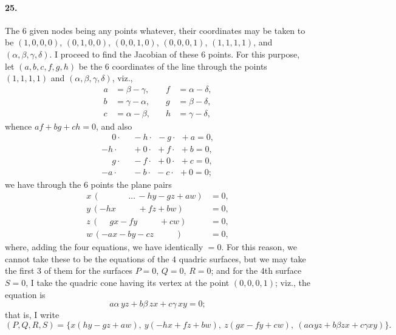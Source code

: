 \documentclass[11pt,a4paper]{article}
\begin{document}
\paragraph{25.}
The $6$ given nodes being any points whatever, their coordinates may be taken to be
$(1, 0, 0, 0)$, $(0, 1, 0, 0)$, $(0, 0, 1, 0)$, $(0, 0, 0, 1)$, $(1, 1, 1, 1)$, and
$(\alpha, \beta, \gamma, \delta)$. I proceed to find the Jacobian of these $6$ points. For
this purpose, let $(a, b, c, f, g, h)$ be the $6$ coordinates of the line through the
points $(1, 1, 1, 1)$ and $(\alpha, \beta, \gamma, \delta)$, viz.,
\[
\begin{aligned}
a &= \beta - \gamma,\quad & f &= \alpha - \delta, \\
b &= \gamma - \alpha,\quad & g &= \beta - \delta, \\
c &= \alpha - \beta,\quad & h &= \gamma - \delta,
\end{aligned}
\]
whence $af + bg + ch = 0$, and also
\[
\begin{aligned}
\phantom{-} 0 \cdot &\phantom{a} - h \cdot \phantom{b} - g \cdot \phantom{c} + a = 0, \\
-h \cdot &\phantom{a} + 0 \cdot \phantom{b} + f \cdot \phantom{c} + b = 0, \\
\phantom{-} g \cdot &\phantom{a} - f \cdot \phantom{b} + 0 \cdot \phantom{c} + c = 0, \\
-a \cdot &\phantom{a} - b \cdot \phantom{b} - c \cdot \phantom{c} + 0 = 0;
\end{aligned}
\]
we have through the $6$ points the plane pairs
\[
\begin{aligned}
x \,(\phantom{-h x +}\, \ldots\, - h y - g z + a w) &= 0, \\
y \,(-h x \phantom{\,+ \ldots\,}\, + f z + b w) &= 0, \\
z \,(\phantom{-}g x - f y \phantom{\,+ \ldots\,}\, + c w) &= 0, \\
w \,(-a x - b y - c z \phantom{\,+ \ldots\,}\,) &= 0,
\end{aligned}
\]
where, adding the four equations, we have identically $= 0$. For this reason, we cannot
take these to be the equations of the $4$ quadric surfaces, but we may take the first $3$
of them for the surfaces $P = 0$, $Q = 0$, $R = 0$; and for the $4$th surface $S = 0$, I
take the quadric cone having its vertex at the point $(0, 0, 0, 1)$; viz., the equation is
\[
a \alpha\,y z + b \beta\,z x + c \gamma\,x y = 0;
\]
that is, I write
\[
(P, Q, R, S) = \{x(hy - gz + aw),\ y(-hx + fz + bw),\ z(gx - fy + cw),\ (a\alpha yz + b\beta zx + c\gamma xy)\}.
\]
\end{document}

